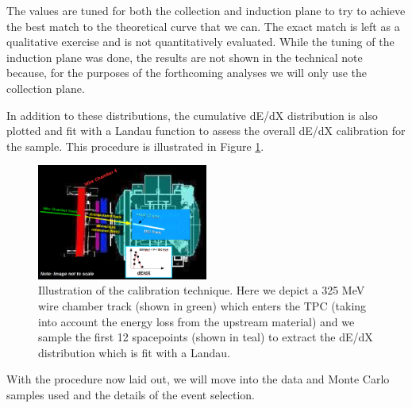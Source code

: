 \begin{itemize}
The values are tuned for both the collection and induction plane to try to achieve the best match to the theoretical curve that we can. The exact match is left as a qualitative exercise and is not quantitatively evaluated. While the tuning of the induction plane was done, the results are not shown in the technical note because, for the purposes of the forthcoming analyses we will only use the collection plane.

In addition to these distributions, the cumulative dE/dX distribution is also plotted and fit with a Landau function to assess the overall dE/dX calibration for the sample. This procedure is illustrated in Figure \ref{fig:CalibrationExample}.

\end{itemize}

\begin{figure}[htb]
\centering
\includegraphics[width=0.50\textwidth]{images/CalibrationExample.png}
\caption{Illustration of the calibration technique. Here we depict a 325 MeV wire chamber track (shown in green) which enters the TPC (taking into account the energy loss from the upstream material) and we sample the first 12 spacepoints (shown in teal) to extract the dE/dX distribution which is fit with a Landau.}
\label{fig:CalibrationExample}
\end{figure}

With the procedure now laid out, we will move into the data and Monte Carlo samples used and the details of the event selection.
